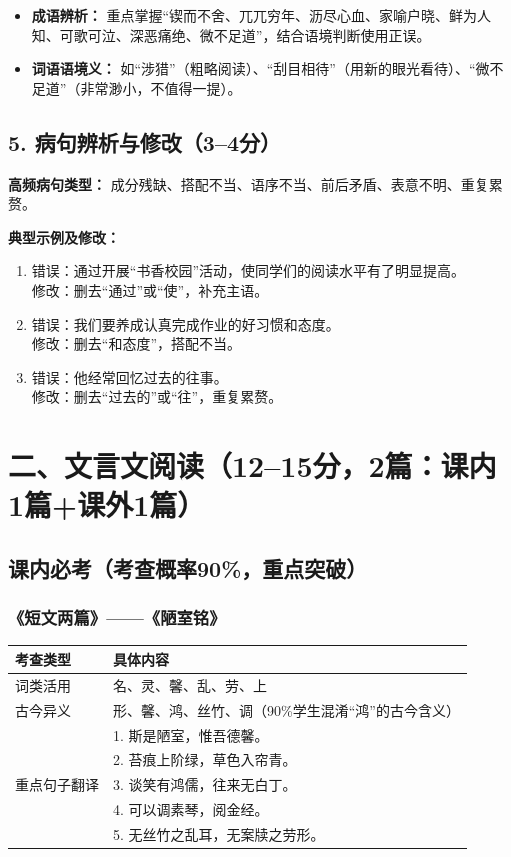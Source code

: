 \begin{itemize}[leftmargin=*]
    \item \textbf{成语辨析：} 重点掌握“锲而不舍、兀兀穷年、沥尽心血、家喻户晓、鲜为人知、可歌可泣、深恶痛绝、微不足道”，结合语境判断使用正误。
    \item \textbf{词语语境义：} 如“涉猎”（粗略阅读）、“刮目相待”（用新的眼光看待）、“微不足道”（非常渺小，不值得一提）。
\end{itemize}

\subsection*{5. 病句辨析与修改（3--4分）}

\textbf{高频病句类型：} 成分残缺、搭配不当、语序不当、前后矛盾、表意不明、重复累赘。

\textbf{典型示例及修改：}

\begin{enumerate}[leftmargin=*]
    \item 错误：通过开展“书香校园”活动，使同学们的阅读水平有了明显提高。\\
    修改：删去“通过”或“使”，补充主语。
    \item 错误：我们要养成认真完成作业的好习惯和态度。\\
    修改：删去“和态度”，搭配不当。
    \item 错误：他经常回忆过去的往事。\\
    修改：删去“过去的”或“往”，重复累赘。
\end{enumerate}

\section*{二、文言文阅读（12--15分，2篇：课内1篇+课外1篇）}

\subsection*{课内必考（考查概率90\%，重点突破）}

\subsubsection*{《短文两篇》——《陋室铭》}

\begin{table}[h]
\centering
\begin{tabular}{|m{4cm}|m{10cm}|}
\hline
\textbf{考查类型} & \textbf{具体内容} \\
\hline
词类活用 & 名、灵、馨、乱、劳、上 \\
\hline
古今异义 & 形、馨、鸿、丝竹、调（90\%学生混淆“鸿”的古今含义） \\
\hline
\multirow{5}{*}{重点句子翻译} & 1. 斯是陋室，惟吾德馨。 \\
 & 2. 苔痕上阶绿，草色入帘青。 \\
 & 3. 谈笑有鸿儒，往来无白丁。 \\
 & 4. 可以调素琴，阅金经。 \\
 & 5. 无丝竹之乱耳，无案牍之劳形。 \\
\hline
\end{tabular}
\end{table}
